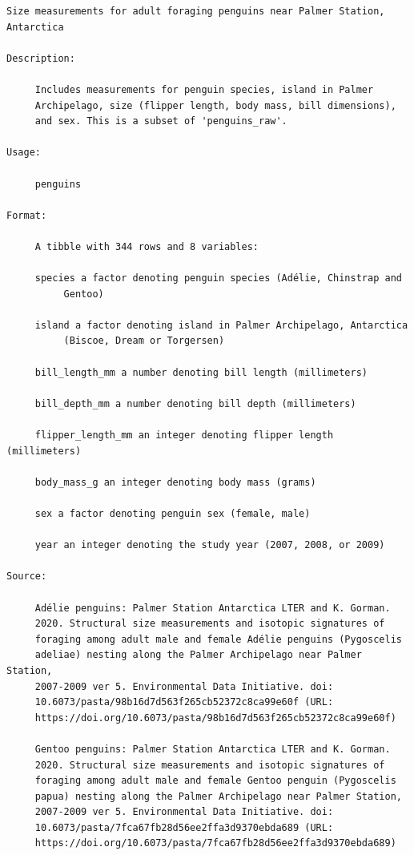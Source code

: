\documentclass[
  letterpaper,
  DIV=11,
  numbers=noendperiod]{scrreprt}
\begin{document}
\begin{verbatim}
Size measurements for adult foraging penguins near Palmer Station,
Antarctica

Description:

     Includes measurements for penguin species, island in Palmer
     Archipelago, size (flipper length, body mass, bill dimensions),
     and sex. This is a subset of 'penguins_raw'.

Usage:

     penguins
     
Format:

     A tibble with 344 rows and 8 variables:

     species a factor denoting penguin species (Adélie, Chinstrap and
          Gentoo)

     island a factor denoting island in Palmer Archipelago, Antarctica
          (Biscoe, Dream or Torgersen)

     bill_length_mm a number denoting bill length (millimeters)

     bill_depth_mm a number denoting bill depth (millimeters)

     flipper_length_mm an integer denoting flipper length (millimeters)

     body_mass_g an integer denoting body mass (grams)

     sex a factor denoting penguin sex (female, male)

     year an integer denoting the study year (2007, 2008, or 2009)

Source:

     Adélie penguins: Palmer Station Antarctica LTER and K. Gorman.
     2020. Structural size measurements and isotopic signatures of
     foraging among adult male and female Adélie penguins (Pygoscelis
     adeliae) nesting along the Palmer Archipelago near Palmer Station,
     2007-2009 ver 5. Environmental Data Initiative. doi:
     10.6073/pasta/98b16d7d563f265cb52372c8ca99e60f (URL:
     https://doi.org/10.6073/pasta/98b16d7d563f265cb52372c8ca99e60f)

     Gentoo penguins: Palmer Station Antarctica LTER and K. Gorman.
     2020. Structural size measurements and isotopic signatures of
     foraging among adult male and female Gentoo penguin (Pygoscelis
     papua) nesting along the Palmer Archipelago near Palmer Station,
     2007-2009 ver 5. Environmental Data Initiative. doi:
     10.6073/pasta/7fca67fb28d56ee2ffa3d9370ebda689 (URL:
     https://doi.org/10.6073/pasta/7fca67fb28d56ee2ffa3d9370ebda689)


\end{verbatim}
\end{document}
